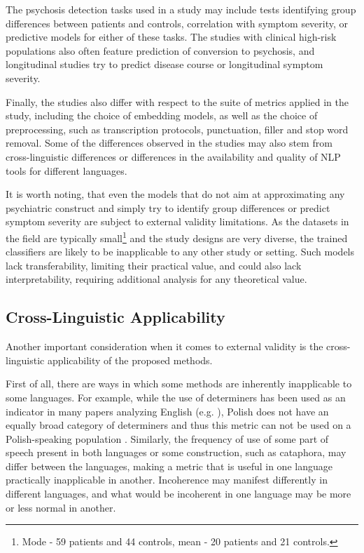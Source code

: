 The psychosis detection tasks used in a study may include tests identifying group differences between patients and controls, correlation with symptom severity, or predictive models for either of these tasks. The studies with clinical high-risk populations also often feature prediction of conversion to psychosis, and longitudinal studies try to predict disease course or longitudinal symptom severity.

Finally, the studies also differ with respect to the suite of metrics applied in the study, including the choice of embedding models, as well as the choice of preprocessing, such as transcription protocols, punctuation, filler and stop word removal. Some of the differences observed in the studies may also stem from cross-linguistic differences or differences in the availability and quality of NLP tools for different languages.

It is worth noting, that even the models that do not aim at approximating any psychiatric construct and simply try to identify group differences or predict symptom severity are subject to external validity limitations. As the datasets in the field are typically small\footnote{Mode - 59 patients and 44 controls, mean - 20 patients and 21 controls.} and the study designs are very diverse, the trained classifiers are likely to be inapplicable to any other study or setting. Such models lack transferability, limiting their practical value, and could also lack interpretability, requiring additional analysis for any theoretical value. 

\subsection{Cross-Linguistic Applicability}
\label{sec:intro:cross-linguitic-applicability}

Another important consideration when it comes to external validity is the cross-linguistic applicability of the proposed methods. 

First of all, there are ways in which some methods are inherently inapplicable to some languages. For example, while the use of determiners has been used as an indicator in many papers analyzing English (e.g. \cite{bedi2015automated, tang2021natural, bilgrami2022construct}), Polish does not have an equally broad category of determiners and thus this metric can not be used on a Polish-speaking population \citep{sarzynska2021detecting}. Similarly, the frequency of use of some part of speech present in both languages or some construction, such as cataphora, may differ between the languages, making a metric that is useful in one language practically inapplicable in another. Incoherence may manifest differently in different languages, and what would be incoherent in one language may be more or less normal in another.

